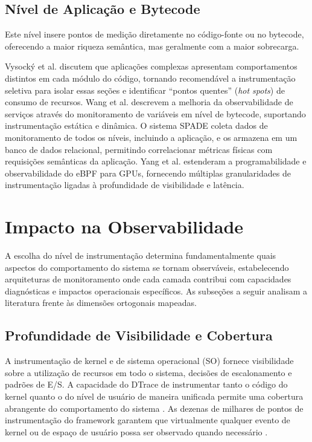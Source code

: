 \documentclass[sigconf, anonymous]{acmart}
\begin{document}
\subsection{Nível de Aplicação e Bytecode}
Este nível insere pontos de medição diretamente no código-fonte ou no bytecode, oferecendo a maior riqueza semântica, mas geralmente com a maior sobrecarga.

Vysocký et al. \cite{vysocky_2019} discutem que aplicações complexas apresentam comportamentos distintos em cada módulo do código, tornando recomendável a instrumentação seletiva para isolar essas seções e identificar ``pontos quentes'' (\textit{hot spots}) de consumo de recursos. Wang et al. \cite{wang_2025} descrevem a melhoria da observabilidade de serviços através do monitoramento de variáveis em nível de bytecode, suportando instrumentação estática e dinâmica. O sistema SPADE \cite{brown_2003} coleta dados de monitoramento de todos os níveis, incluindo a aplicação, e os armazena em um banco de dados relacional, permitindo correlacionar métricas físicas com requisições semânticas da aplicação. Yang et al. \cite{yang_2025} estenderam a programabilidade e observabilidade do eBPF para GPUs, fornecendo múltiplas granularidades de instrumentação ligadas à profundidade de visibilidade e latência.

\section{Impacto na Observabilidade}
\label{sec:observabilidade-impacto}

A escolha do nível de instrumentação determina fundamentalmente quais aspectos do comportamento do sistema se tornam observáveis, estabelecendo arquiteturas de monitoramento onde cada camada contribui com capacidades diagnósticas e impactos operacionais específicos. As subseções a seguir analisam a literatura frente às dimensões ortogonais mapeadas.

\subsection{Profundidade de Visibilidade e Cobertura}

A instrumentação de kernel e de sistema operacional (SO) fornece visibilidade sobre a utilização de recursos em todo o sistema, decisões de escalonamento e padrões de E/S. A capacidade do DTrace de instrumentar tanto o código do kernel quanto o do nível de usuário de maneira unificada permite uma cobertura abrangente do comportamento do sistema \cite{cantrill_2004}. As dezenas de milhares de pontos de instrumentação do framework garantem que virtualmente qualquer evento de kernel ou de espaço de usuário possa ser observado quando necessário \cite{cantrill_2004}.
\end{document}
